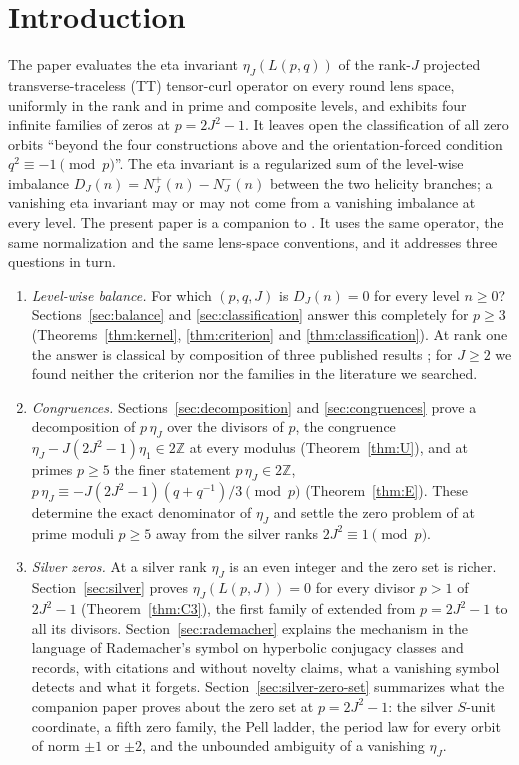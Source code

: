 \documentclass[11pt]{article}
\theoremstyle{definition}
\newcommand{\Z}{\mathbb Z}
\begin{document}
\section{Introduction}

The paper \cite{MahmoodP1Collection2026} evaluates the eta invariant
$\eta_J(L(p,q))$ of the rank-$J$ projected transverse-traceless (TT)
tensor-curl operator on every round lens space, uniformly in the rank and
in prime and composite levels, and exhibits four infinite families of
zeros at $p=2J^2-1$.  It leaves open the classification of all zero
orbits ``beyond the four constructions above and the orientation-forced
condition $q^2\equiv-1\pmod p$''.  The eta invariant is a regularized sum
of the level-wise imbalance $D_J(n)=N^+_J(n)-N^-_J(n)$ between the two
helicity branches; a vanishing eta invariant may or may not come from a
vanishing imbalance at every level.  The present paper is a companion to
\cite{MahmoodP1Collection2026}.  It uses the same operator, the same
normalization and the same lens-space conventions, and it addresses three
questions in turn.

\begin{enumerate}[label=(\roman*)]
\item \emph{Level-wise balance.}  For which $(p,q,J)$ is $D_J(n)=0$ for
every level $n\geq0$?  Sections~\ref{sec:balance} and
\ref{sec:classification} answer this completely for $p\geq3$
(Theorems~\ref{thm:kernel}, \ref{thm:criterion} and
\ref{thm:classification}).  At rank one the answer is classical by
composition of three published results
\cite{Bar2019,Katase1987,RademacherGrosswald1972,PrzytyckiYasuhara2003,
Boldt2017}; for $J\geq2$ we found neither the criterion nor the families
in the literature we searched.
\item \emph{Congruences.}  Sections~\ref{sec:decomposition} and
\ref{sec:congruences} prove a decomposition of $p\,\eta_J$ over the
divisors of $p$, the congruence
$\eta_J-J(2J^2-1)\eta_1\in2\Z$ at every modulus (Theorem~\ref{thm:U}),
and at primes $p\geq5$ the finer statement
$p\,\eta_J\in2\Z$, $p\,\eta_J\equiv-J(2J^2-1)(q+q^{-1})/3\pmod p$
(Theorem~\ref{thm:E}).  These determine the exact denominator of
$\eta_J$ and settle the zero problem of \cite{MahmoodP1Collection2026}
at prime moduli $p\geq5$ away from the silver ranks $2J^2\equiv1\pmod p$.
\item \emph{Silver zeros.}  At a silver rank $\eta_J$ is an even integer
and the zero set is richer.  Section~\ref{sec:silver} proves
$\eta_J(L(p,J))=0$ for every divisor $p>1$ of $2J^2-1$
(Theorem~\ref{thm:C3}), the first family of
\cite{MahmoodP1Collection2026} extended from $p=2J^2-1$ to all its
divisors.  Section~\ref{sec:rademacher} explains the mechanism in the
language of Rademacher's symbol on hyperbolic conjugacy classes and
records, with citations and without novelty claims, what a vanishing
symbol detects and what it forgets.  Section~\ref{sec:silver-zero-set}
summarizes what the companion paper \cite{SilverRankZeros2026} proves
about the zero set at $p=2J^2-1$: the silver $S$-unit coordinate, a
fifth zero family, the Pell ladder, the period law for every orbit of
norm $\pm1$ or $\pm2$, and the unbounded ambiguity of a vanishing
$\eta_J$.
\end{enumerate}
\end{document}
